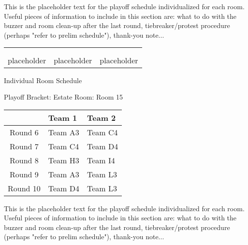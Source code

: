 \documentclass{article}%
\begin{document}
\vspace*{16pt}%
\linebreak%
This is the placeholder text for the playoff schedule individualized for each room. Useful pieces of information to include in this section are: what to do with the buzzer and room clean{-}up after the last round, tiebreaker/protest procedure (perhaps "refer to prelim schedule"), thank{-}you note...%
\vspace*{30pt}%
\newline%
%
\begin{tabularx}{\textwidth}{YYY}%
  &  &  \\%
\\%
placeholder&placeholder&placeholder\\%
\end{tabularx}%
\newpage%
\begin{center}%
\begin{Huge}%
Individual Room Schedule%
\end{Huge}%
\vspace*{16pt}%
\linebreak%
\begin{Large}%
Playoff Bracket: Estate \hfill Room: Room 15%
\end{Large}%
\end{center}%
%
\begin{tabularx}{\textwidth}{|c|Y|Y|}%
\hline%
&Team 1&Team 2\\%
\hline%
Round 6&Team A3&Team C4\\%
Round 7&Team C4&Team D4\\%
Round 8&Team H3&Team I4\\%
Round 9&Team A3&Team L3\\%
Round 10&Team D4&Team L3\\%
\hline%
\end{tabularx}%
\vspace*{16pt}%
\linebreak%
This is the placeholder text for the playoff schedule individualized for each room. Useful pieces of information to include in this section are: what to do with the buzzer and room clean{-}up after the last round, tiebreaker/protest procedure (perhaps "refer to prelim schedule"), thank{-}you note...%
\vspace*{30pt}%
\newline%
\end{document}
